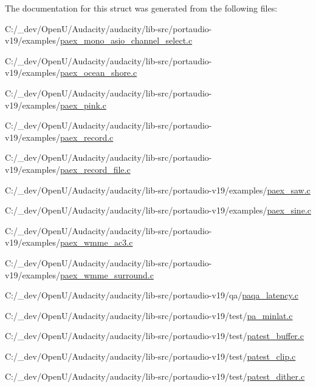 The documentation for this struct was generated from the following files\+:\begin{DoxyCompactItemize}
\item 
C\+:/\+\_\+dev/\+Open\+U/\+Audacity/audacity/lib-\/src/portaudio-\/v19/examples/\hyperlink{paex__mono__asio__channel__select_8c}{paex\+\_\+mono\+\_\+asio\+\_\+channel\+\_\+select.\+c}\item 
C\+:/\+\_\+dev/\+Open\+U/\+Audacity/audacity/lib-\/src/portaudio-\/v19/examples/\hyperlink{paex__ocean__shore_8c}{paex\+\_\+ocean\+\_\+shore.\+c}\item 
C\+:/\+\_\+dev/\+Open\+U/\+Audacity/audacity/lib-\/src/portaudio-\/v19/examples/\hyperlink{paex__pink_8c}{paex\+\_\+pink.\+c}\item 
C\+:/\+\_\+dev/\+Open\+U/\+Audacity/audacity/lib-\/src/portaudio-\/v19/examples/\hyperlink{paex__record_8c}{paex\+\_\+record.\+c}\item 
C\+:/\+\_\+dev/\+Open\+U/\+Audacity/audacity/lib-\/src/portaudio-\/v19/examples/\hyperlink{paex__record__file_8c}{paex\+\_\+record\+\_\+file.\+c}\item 
C\+:/\+\_\+dev/\+Open\+U/\+Audacity/audacity/lib-\/src/portaudio-\/v19/examples/\hyperlink{paex__saw_8c}{paex\+\_\+saw.\+c}\item 
C\+:/\+\_\+dev/\+Open\+U/\+Audacity/audacity/lib-\/src/portaudio-\/v19/examples/\hyperlink{paex__sine_8c}{paex\+\_\+sine.\+c}\item 
C\+:/\+\_\+dev/\+Open\+U/\+Audacity/audacity/lib-\/src/portaudio-\/v19/examples/\hyperlink{paex__wmme__ac3_8c}{paex\+\_\+wmme\+\_\+ac3.\+c}\item 
C\+:/\+\_\+dev/\+Open\+U/\+Audacity/audacity/lib-\/src/portaudio-\/v19/examples/\hyperlink{paex__wmme__surround_8c}{paex\+\_\+wmme\+\_\+surround.\+c}\item 
C\+:/\+\_\+dev/\+Open\+U/\+Audacity/audacity/lib-\/src/portaudio-\/v19/qa/\hyperlink{paqa__latency_8c}{paqa\+\_\+latency.\+c}\item 
C\+:/\+\_\+dev/\+Open\+U/\+Audacity/audacity/lib-\/src/portaudio-\/v19/test/\hyperlink{pa__minlat_8c}{pa\+\_\+minlat.\+c}\item 
C\+:/\+\_\+dev/\+Open\+U/\+Audacity/audacity/lib-\/src/portaudio-\/v19/test/\hyperlink{patest__buffer_8c}{patest\+\_\+buffer.\+c}\item 
C\+:/\+\_\+dev/\+Open\+U/\+Audacity/audacity/lib-\/src/portaudio-\/v19/test/\hyperlink{patest__clip_8c}{patest\+\_\+clip.\+c}\item 
C\+:/\+\_\+dev/\+Open\+U/\+Audacity/audacity/lib-\/src/portaudio-\/v19/test/\hyperlink{patest__dither_8c}{patest\+\_\+dither.\+c}\item 

\end{DoxyCompactItemize}
